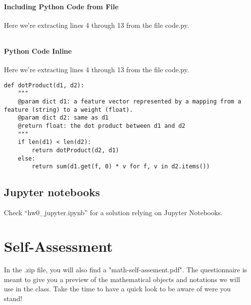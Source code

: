 \documentclass[12pt]{article}
\begin{document}
\paragraph{Including Python Code from File}
Here we're extracting lines 4 through 13 from the file code.py.
\inputminted[firstline=4, lastline=13, breaklines=True]{python}{code.py}

\paragraph{Python Code Inline}
Here we're extracting lines 4 through 13 from the file code.py.
\begin{verbatim}
def dotProduct(d1, d2):
    """
    @param dict d1: a feature vector represented by a mapping from a feature (string) to a weight (float).
    @param dict d2: same as d1
    @return float: the dot product between d1 and d2
    """
    if len(d1) < len(d2):
        return dotProduct(d2, d1)
    else:
        return sum(d1.get(f, 0) * v for f, v in d2.items())
\end{verbatim}


\subsection{Jupyter notebooks}
Check ``hw0\_jupyter.ipynb'' for a solution relying on Jupyter Notebooks.

\section{Self-Assessment}
In the .zip file, you will also find a "math-self-assement.pdf". The questionnaire is meant to give you a preview of the mathematical objects and notations we will use in the class. Take the time to have a quick look to be aware of were you stand!
\end{document}
